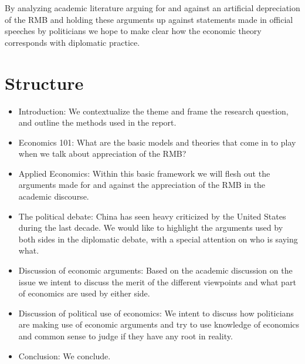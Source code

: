 \documentclass[11pt]{article}
\begin{document}
By analyzing academic literature arguing for and against an artificial 
depreciation of the RMB and holding these arguments up against 
statements made in official speeches by politicians we hope to make 
clear how the economic theory corresponds with diplomatic practice.

\section{Structure}

\begin{itemize}
\item{Introduction: We contextualize the theme and frame the research 
question, and outline the methods used in the report.}

\item{Economics 101: What are the basic models and theories that come in 
to play when we talk about appreciation of the RMB?}

\item{Applied Economics: Within this basic framework we will flesh out 
the arguments made for and against the appreciation of the RMB in the 
academic discourse.}

\item{The political debate: China has seen heavy criticized by the 
United States during the last decade. We would like to highlight the 
arguments used by both sides in the diplomatic debate, with a special 
attention on who is saying what.}

\item{Discussion of economic arguments: Based on the academic discussion 
on the issue we intent to discuss the merit of the different viewpoints 
and what part of economics are used by either side.}

%
\item{Discussion of political use of economics: We intent to discuss how 
politicians are making use of economic arguments and try to use 
knowledge of economics and common sense to judge if they have any root 
in reality.}

\item{Conclusion: We conclude.}

\end{itemize}

\nocite{*}


\end{document}
